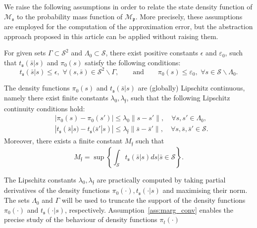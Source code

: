 \documentclass{LMCS}
\begin{document}
We raise the following assumptions in order to
relate the state density function of $\mathscr M_{\mathfrak s}$ to the probability mass function of $\mathscr M_{\mathfrak p}$.
More precisely, 
these assumptions are employed for the computation of the approximation error, 
but the abstraction approach proposed in this article can be applied without raising them.
\begin{asm}
\label{ass:marg_conv}
For given sets $\varGamma\subset\mathcal S^2$ and $\Lambda_0\subset\mathcal S$,
there exist positive constants $\epsilon$ and $\varepsilon_0$, such that 
$t_{\mathfrak s}(\bar s|s)$ and $\pi_0(s)$ satisfy the following conditions: 
\begin{equation}
\label{eq:ineq_dens}
t_{\mathfrak s}(\bar s|s)\le \epsilon, \,\,
\forall (s,\bar s)\in\mathcal S^2\backslash\varGamma, 
\qquad \text{and}\qquad
\pi_0(s)\le \varepsilon_0, \,\,
\forall s\in\mathcal S\backslash\Lambda_0.
\end{equation}
\end{asm}
\begin{asm}
\label{ass:Lip_cont_bounded}
The density functions $\pi_0(s)$ and $t_{\mathfrak s}(\bar s|s)$ are (globally) Lipschitz continuous,  
namely there exist finite constants $\lambda_0, \lambda_{\mathfrak f}$, 
such that the following Lipschitz continuity conditions hold: 
\begin{align}
& |\pi_0(s)-\pi_0(s')|\le\lambda_0 \|s-s'\|, \quad
\forall s,s'\in\Lambda_0,\label{eq:cond_init_dens}\\
& |t_{\mathfrak s}(\bar s|s)-t_{\mathfrak s}(\bar s'|s)|\le \lambda_{\mathfrak f}\|\bar s-\bar s'\|, \quad
\forall s,\bar s,\bar s'\in\mathcal S.
\label{eq:cond_kern}
\end{align}
Moreover, there exists a finite constant $M_{\mathfrak f}$ such that
\begin{equation}
M_{\mathfrak f} = \sup\left\{\int_{\mathcal S}t_{\mathfrak s}(\bar s|s)ds\bigg| \bar s\in\mathcal S\right\}.
\end{equation}
\end{asm}
The Lipschitz constants $\lambda_0,\lambda_{\mathfrak f}$ are practically computed by taking partial derivatives of the density functions $\pi_0(\cdot),t_{\mathfrak s}(\cdot|s)$ and maximising their norm.
The sets $\Lambda_0$ and $\varGamma$ will be used to truncate the support of the density functions 
$\pi_0(\cdot)$ and $t_{\mathfrak s}(\cdot| s)$, respectively. 
Assumption~\ref{ass:marg_conv} enables the precise study of the behaviour of density functions $\pi_t(\cdot)$
\end{document}
